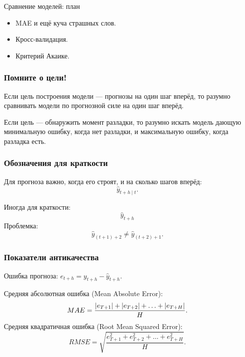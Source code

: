 
\begin{frame} %


\end{frame}



\begin{frame}{Сравнение моделей: план}
  \begin{itemize}[<+->]
    \item MAE и ещё куча страшных слов. 
    \item Кросс-валидация.
    \item Критерий Акаике.
  \end{itemize}

\end{frame}


\begin{frame}
  \frametitle{Помните о цели!}

  Если цель построения модели — прогнозы на один шаг вперёд, 
  то разумно сравнивать модели по прогнозной силе на один шаг вперёд. 

  \pause
  Если цель — обнаружить момент разладки,
  то разумно искать модель дающую минимальную ошибку, когда нет разладки, 
  и максимальную ошибку, когда разладка есть. 

\end{frame}

\begin{frame}
    \frametitle{Обозначения для краткости}

    Для прогноза важно, \alert{когда} его строят, и на \alert{сколько шагов вперёд}:
    \[
    \hat y_{t+h \mid t}.    
    \]

    \pause 
    Иногда для \alert{краткости}:
    \[
    \hat y_{t+h}    
    \]
    \pause 
    Проблемка:
    \[
    \hat y_{(t+1) + 2} \neq \hat y_{(t+2) + 1}.    
    \]    
    
\end{frame}


\begin{frame}
    \frametitle{Показатели антикачества}

    \alert{Ошибка прогноза}: $e_{t+h} = y_{t+h} - \hat y_{t+h}$.

    \pause
    \alert{Средняя абсолютная ошибка} (Mean Absolute Error):
    \[
    MAE = \frac{\abs {e_{T+1}} + \abs{e_{T+2}}+ \ldots + \abs{e_{T+H}} }{H}.
    \]
    \pause
    \alert{Средняя квадратичная ошибка} (Root Mean Squared Error):
    \[
        RMSE = \sqrt{ \frac{e^2_{T+1} + e^2_{T+2}+ \ldots + e^2_{T+H} }{H} }.
    \]
    
\end{frame}


